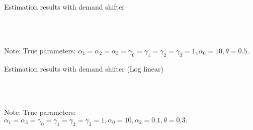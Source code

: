 \documentclass[11pt, a4paper]{article}
\begin{document}
\begin{table}[!htbp]
  \begin{center}
      \caption{Estimation results with demand shifter}
      \label{tb:linear_linear_sigma_1} 
      \subfloat[$\sigma=0.001$]{}\\
      \subfloat[$\sigma=0.5$]{}\\
    \subfloat[$\sigma=2.0$]{}
  \end{center}\footnotesize
  Note: True parameters: $\alpha_1 = \alpha_2 = \alpha_3 = \gamma_0 = \gamma_1 = \gamma_2  = \gamma_3 = 1, \alpha_0 = 10, \theta = 0.5.$
\end{table} 


\begin{table}[!htbp]
  \begin{center}
      \caption{Estimation results with demand shifter (Log linear)}
      \label{tb:loglinear_loglinear_sigma_1} 
      \subfloat[$\sigma=0.001$]{}\\
      \subfloat[$\sigma=0.5$]{}\\
    \subfloat[$\sigma=2.0$]{}
  \end{center}\footnotesize
  Note: True parameters: $\alpha_1 = \alpha_3 = \gamma_0 = \gamma_1 = \gamma_2  = \gamma_3 = 1, \alpha_0 = 10, \alpha_2 = 0.1,  \theta = 0.3.$
\end{table} 










\end{document}
